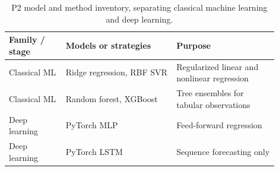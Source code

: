 \begin{table}[!htbp]\centering\footnotesize
\setlength{\tabcolsep}{5pt}
\caption{P2 model and method inventory, separating classical machine learning and deep learning.}\label{tab:p2methods}
\begin{tabular}{@{}p{0.19\linewidth}p{0.37\linewidth}p{0.34\linewidth}@{}}\toprule
\textbf{Family / stage} & \textbf{Models or strategies} & \textbf{Purpose}\\\midrule
\rowcolor{gold!10}
Classical ML & Ridge regression, RBF SVR & Regularized linear and nonlinear regression\\
\rowcolor{gold!10}
Classical ML & Random forest, XGBoost & Tree ensembles for tabular observations\\
\rowcolor{teal!9}
Deep learning & PyTorch MLP & Feed-forward regression\\
\rowcolor{teal!9}
Deep learning & PyTorch LSTM & Sequence forecasting only\\
\bottomrule\end{tabular}
\end{table}

